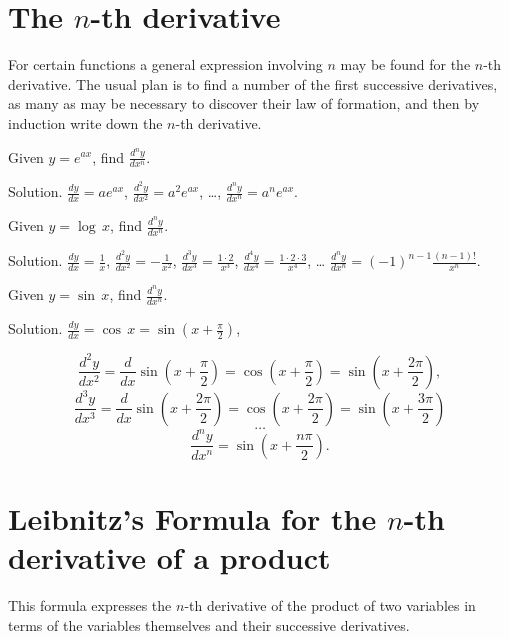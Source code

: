 
\section{The $n$-th derivative}

For certain functions a general expression involving $n$ 
may be found for the $n$-th derivative. The usual plan 
is to find a number of the first successive derivatives, as 
many as may be necessary to discover their law of formation, 
and then by induction write down the $n$-th derivative.

\begin{example}
{\rm
Given $y = e^{ax}$, find $\frac{d^n y}{dx^n}$.

Solution. $\frac{dy}{dx} = ae^{ax}$,
$\frac{d^2 y}{dx^2} 	= a^2e^{ax}$, \dots ,
$\frac{d^n y}{dx^n} = a^ne^{ax}$.

}
\end{example}

\begin{example}
{\rm
Given $y = \log\, x$, find $\frac{d^n y}{dx^n}$.

Solution. $\frac{dy}{dx} 	= \frac{1}{x}$,
$\frac{d^2 y}{dx^2} 	= -\frac{1}{x^2}$,
$\frac{d^3 y}{dx^3} 	= \frac{1 \cdot 2}{x^3}$,
$\frac{d^4 y}{dx^4} 	= \frac{1 \cdot 2 \cdot 3}{x^4}$,
\dots 
$\frac{d^n y}{dx^n} 	= (-1)^{n - 1} \frac{(n - 1)!}{x^n}$.
}
\end{example}

\begin{example}
{\rm
Given $y = \sin\, x$, find $\frac{d^n y}{dx^n}$.

Solution.
$\frac{dy}{dx} = \cos\, x = \sin \left ( x + \frac{\pi}{2} \right )$,

\[
\frac{d^2 y}{dx^2} 
= \frac{d}{dx} \sin \left ( x + \frac{\pi}{2} \right ) 	
= \cos \left ( x + \frac{\pi}{2} \right ) 
= \sin \left ( x + \frac{2 \pi}{2} \right ),
\]
\[
\frac{d^3 y}{dx^3} 
= \frac{d}{dx} \sin \left ( x + \frac{2 \pi}{2} \right ) 	
= \cos \left ( x + \frac{2 \pi}{2} \right ) 
= \sin \left ( x + \frac{3 \pi}{2} \right )
\]
\[
\dots
\]
\[
\frac{d^n y}{dx^n} 	= \sin \left ( x + \frac{n \pi}{2} \right ).
\]
}
\end{example}

\section{Leibnitz's Formula for the $n$-th derivative of a product}

This formula expresses the $n$-th derivative of the 
product of two variables in terms of the variables 
themselves and their successive derivatives.

